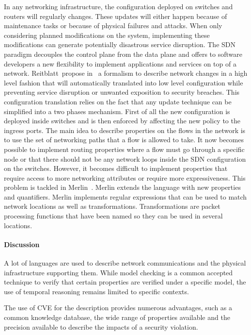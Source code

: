 In any networking infrastructure, the configuration deployed on switches and routers will regularly changes. These updates will either happen because of maintenance tasks or because of physical failures and attacks.
When only considering planned modifications on the system, implementing these modifications can generate potentially disastrous service disruption.
The SDN paradigm decouples the control plane from the data plane and offers to software developers a new flexibility to implement applications and services on top of a network.
Reitblatt~\etal propose in~\cite{abstraction-reitblatt2012} a formalism to describe network changes in a high level fashion that will automatically translated into low level configuration while preventing service disruption or unwanted exposition to security breaches.
This configuration translation relies on the fact that any update technique can be simplified into a two phases mechanism. First of all the new configuration is deployed inside switches and is then enforced by affecting the new policy to the ingress ports.
The main idea to describe properties on the flows in the network is to use the set of networking paths that a flow is allowed to take.
It now becomes possible to implement routing properties where a flow must go through a specific node or that there should not be any network loops inside the SDN configuration on the switches.
However, it becomes difficult to implement properties that require access to more networking attributes or require more expressiveness. This problem is tackled in Merlin~\cite{Merlin-Soule2013}.
Merlin extends the language with new properties and quantifiers.
Merlin implements regular expressions that can be used to match network locations as well as transformations.
Transformations are packet processing functions that have been named so they can be used in several locations.



\paragraph{Discussion}

A lot of languages are used to describe network communications and the physical infrastructure supporting them. While model checking is a common accepted technique to verify that certain properties are verified under a specific model, the use of temporal reasoning remains limited to specific contexts.

The use of CVE for the description provides numerous advantages, such as a common knowledge database, the wide range of properties available and the precision available to describe the impacts of a security violation.



